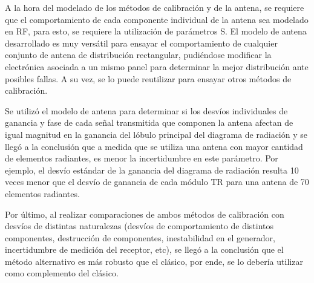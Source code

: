 A la hora del modelado de los métodos de calibración y de la antena, se requiere que el comportamiento de cada componente 
individual de la antena sea modelado en RF, para esto, se requiere la utilización de parámetros S. El modelo de antena 
desarrollado es muy versátil para ensayar el comportamiento de cualquier conjunto de antena de distribución rectangular, 
pudiéndose modificar la electrónica asociada a un mismo panel para determinar la mejor distribución ante posibles fallas.
A su vez, se lo puede reutilizar para ensayar otros métodos de calibración.

Se utilizó el modelo de antena para determinar si los desvíos individuales de ganancia y fase de cada señal transmitida que 
componen la antena afectan de igual magnitud en la ganancia del lóbulo principal del diagrama de radiación y se llegó a la 
conclusión que a medida que se utiliza una antena con mayor cantidad de elementos radiantes, es menor la incertidumbre en este 
parámetro. Por ejemplo, el desvío estándar de la ganancia del diagrama de radiación resulta 10 veces menor que el desvío de 
ganancia de cada módulo TR para una antena de 70 elementos radiantes.

Por último, al realizar comparaciones de ambos métodos de calibración con desvíos de distintas naturalezas (desvíos de 
comportamiento de distintos componentes, destrucción de componentes, inestabilidad en el generador, incertidumbre de medición 
del receptor, etc), se llegó a la conclusión que el método alternativo es más robusto que el clásico, por ende, se lo 
debería utilizar como complemento del clásico.

